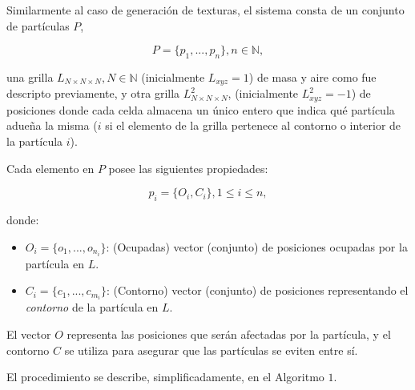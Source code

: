 Similarmente al caso de generación de texturas, el sistema consta de un conjunto de part\'iculas $P$,

\begin{equation}
  P = \{p_{1}, ... , p_{n}\}, n  \in \mathbb{N},
\end{equation}

\noindent una grilla $L_{N\times N \times N}, N \in \mathbb{N} $ (inicialmente $L_{xyz}=1$) de masa y aire como fue descripto previamente, y otra grilla $L^{2}_{N\times N \times N}$, (inicialmente $L^{2}_{xyz}=-1$) de posiciones donde cada celda almacena un único entero que indica qu\'e part\'icula adue\~na la misma ($i$ si el elemento de la grilla pertenece al contorno o interior de la part\'icula $i$).

Cada elemento en $P$ posee las siguientes propiedades:

\begin{equation}
  p_{i} = \{O_{i}, C_{i}\}, 1 \le i \le n,
\end{equation}

\noindent donde:

\begin{itemize}
\item $O_{i} = \{o_{1}, ... , o_{n_{i}}\}$: (Ocupadas) vector (conjunto) de posiciones ocupadas por la part\'icula en $L$.

\item $C_{i} = \{c_{1}, ... , c_{m_{i}}\}$: (Contorno) vector (conjunto) de posiciones representando el {\em contorno} de la part\'icula en $L$.
\end{itemize}

El vector $O$ representa las posiciones que ser\'an afectadas por la part\'icula, y el contorno $C$ se utiliza para asegurar que las part\'iculas se eviten entre s\'i.

El procedimiento se describe, simplificadamente, en el Algoritmo $1$. 

